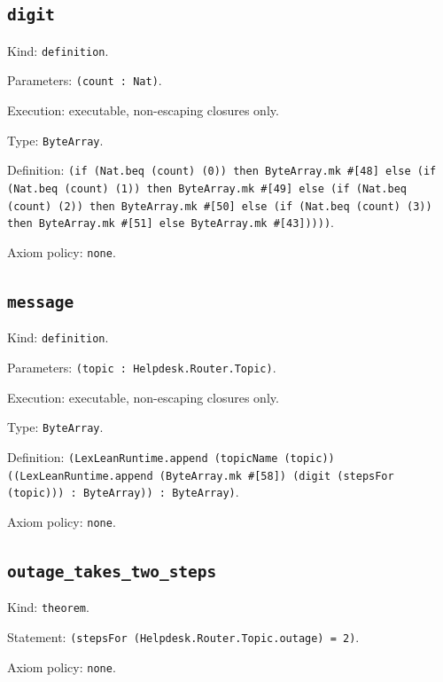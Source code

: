 \documentclass[11pt]{article}
\begin{document}
\subsection*{\texttt{digit}}
\noindent Kind: \texttt{definition}.\par
\noindent Parameters: \texttt{(count : Nat)}.\par
\noindent Execution: executable, non-escaping closures only.\par
\noindent Type: \texttt{ByteArray}.\par
\noindent Definition: \texttt{(if (Nat.beq (count) (0)) then ByteArray.mk \#[48] else (if (Nat.beq (count) (1)) then ByteArray.mk \#[49] else (if (Nat.beq (count) (2)) then ByteArray.mk \#[50] else (if (Nat.beq (count) (3)) then ByteArray.mk \#[51] else ByteArray.mk \#[43]))))}.\par
\noindent Axiom policy: \texttt{none}.\par
\subsection*{\texttt{message}}
\noindent Kind: \texttt{definition}.\par
\noindent Parameters: \texttt{(topic : Helpdesk.Router.Topic)}.\par
\noindent Execution: executable, non-escaping closures only.\par
\noindent Type: \texttt{ByteArray}.\par
\noindent Definition: \texttt{(LexLeanRuntime.append (topicName (topic)) ((LexLeanRuntime.append (ByteArray.mk \#[58]) (digit (stepsFor (topic))) : ByteArray)) : ByteArray)}.\par
\noindent Axiom policy: \texttt{none}.\par
\subsection*{\texttt{outage\_takes\_two\_steps}}
\noindent Kind: \texttt{theorem}.\par
\noindent Statement: \texttt{(stepsFor (Helpdesk.Router.Topic.outage) = 2)}.\par
\noindent Axiom policy: \texttt{none}.\par
\end{document}
